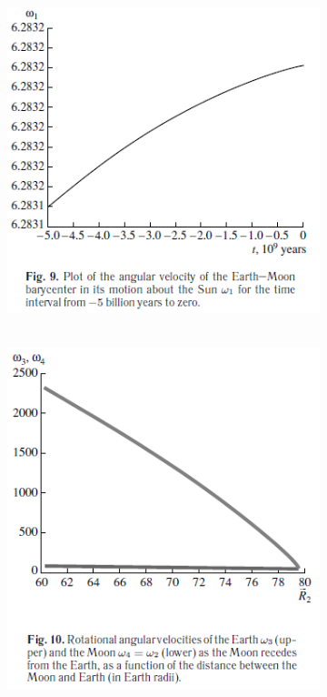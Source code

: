 \documentclass[fontsize = 11pt,a4paper]{article}
\begin{document}
\begin{figure}[h!]
  \begin{subfigure}[t]{0.4\linewidth}
    \includegraphics[width=\linewidth]{graph9.png}
  \end{subfigure}
  \begin{subfigure}[t]{0.4\linewidth}
\hbox{\hspace{+9em}
    \includegraphics[width=\linewidth]{graph10.png}
}
  \end{subfigure}
\end{figure}
\end{document}
